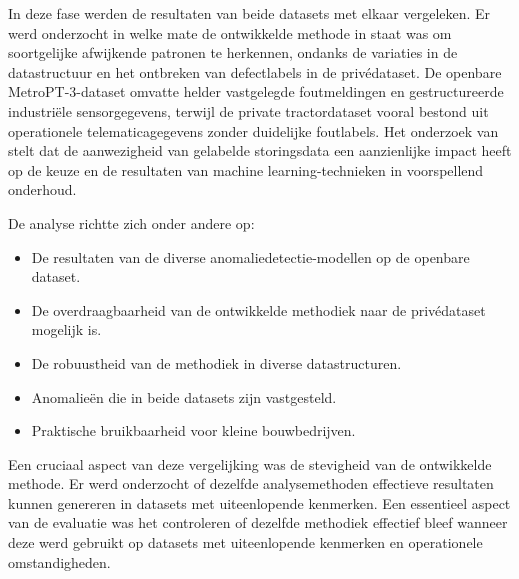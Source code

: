  
In deze fase werden de resultaten van beide datasets met elkaar vergeleken. Er werd onderzocht in welke mate de ontwikkelde methode in staat was om soortgelijke afwijkende patronen te herkennen, ondanks de variaties in de datastructuur en het ontbreken van defectlabels in de privédataset. De openbare MetroPT-3-dataset omvatte helder vastgelegde foutmeldingen en gestructureerde industriële sensorgegevens, terwijl de private tractordataset vooral bestond uit operationele telematicagegevens zonder duidelijke foutlabels. Het onderzoek van \textcite{Carvalho2019} stelt dat de aanwezigheid van gelabelde storingsdata een aanzienlijke impact heeft op de keuze en de resultaten van machine learning-technieken in voorspellend onderhoud.

De analyse richtte zich onder andere op:
\begin{itemize}
    \item De resultaten van de diverse anomaliedetectie-modellen op de openbare dataset.
    
    \item De overdraagbaarheid van de ontwikkelde methodiek naar de privédataset mogelijk is.
    
    \item De robuustheid van de methodiek in diverse datastructuren.
    
    \item Anomalieën die in beide datasets zijn vastgesteld.
    
    \item Praktische bruikbaarheid voor kleine bouwbedrijven.
\end{itemize}

Een cruciaal aspect van deze vergelijking was de stevigheid van de ontwikkelde methode. Er werd onderzocht of dezelfde analysemethoden effectieve resultaten kunnen genereren in datasets met uiteenlopende kenmerken. Een essentieel aspect van de evaluatie was het controleren of dezelfde methodiek effectief bleef wanneer deze werd gebruikt op datasets met uiteenlopende kenmerken en operationele omstandigheden.

